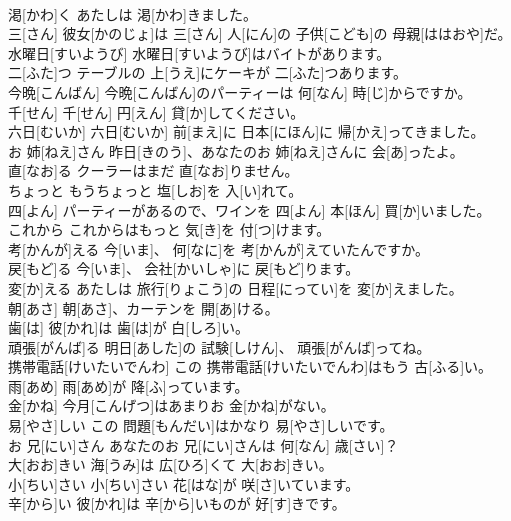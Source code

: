 \documentclass[8pt]{extreport}
\begin{document}
\begin{CJK}{UTF8}{min}
\\	渇[かわ]く	あたしは 渇[かわ]きました。		
\\	三[さん]	彼女[かのじょ]は 三[さん] 人[にん]の 子供[こども]の 母親[ははおや]だ。		
\\	水曜日[すいようび]	水曜日[すいようび]はバイトがあります。		
\\	二[ふた]つ	テーブルの 上[うえ]にケーキが 二[ふた]つあります。		
\\	今晩[こんばん]	今晩[こんばん]のパーティーは 何[なん] 時[じ]からですか。		
\\	千[せん]	千[せん] 円[えん] 貸[か]してください。		
\\	六日[むいか]	六日[むいか] 前[まえ]に 日本[にほん]に 帰[かえ]ってきました。		
\\	お 姉[ねえ]さん	昨日[きのう]、あなたのお 姉[ねえ]さんに 会[あ]ったよ。		
\\	直[なお]る	クーラーはまだ 直[なお]りません。		
\\	ちょっと	もうちょっと 塩[しお]を 入[い]れて。		
\\	四[よん]	パーティーがあるので、ワインを 四[よん] 本[ほん] 買[か]いました。		
\\	これから	これからはもっと 気[き]を 付[つ]けます。		
\\	考[かんが]える	今[いま]、 何[なに]を 考[かんが]えていたんですか。		
\\	戻[もど]る	今[いま]、 会社[かいしゃ]に 戻[もど]ります。		
\\	変[か]える	あたしは 旅行[りょこう]の 日程[にってい]を 変[か]えました。		
\\	朝[あさ]	朝[あさ]、カーテンを 開[あ]ける。		
\\	歯[は]	彼[かれ]は 歯[は]が 白[しろ]い。		
\\	頑張[がんば]る	明日[あした]の 試験[しけん]、 頑張[がんば]ってね。		
\\	携帯電話[けいたいでんわ]	この 携帯電話[けいたいでんわ]はもう 古[ふる]い。		
\\	雨[あめ]	雨[あめ]が 降[ふ]っています。		
\\	金[かね]	今月[こんげつ]はあまりお 金[かね]がない。		
\\	易[やさ]しい	この 問題[もんだい]はかなり 易[やさ]しいです。		
\\	お 兄[にい]さん	あなたのお 兄[にい]さんは 何[なん] 歳[さい]？		
\\	大[おお]きい	海[うみ]は 広[ひろ]くて 大[おお]きい。		
\\	小[ちい]さい	小[ちい]さい 花[はな]が 咲[さ]いています。		
\\	辛[から]い	彼[かれ]は 辛[から]いものが 好[す]きです。		

\end{CJK}
\end{document}
